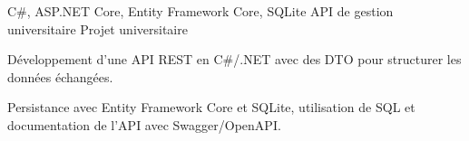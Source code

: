 
\begin{cventries}
  \cventry
    {C\#, ASP.NET Core, Entity Framework Core, SQLite}
    {API de gestion universitaire}
    {Projet universitaire}
    {}
    {
      \begin{cvitems}
        \item {Développement d’une API REST en C\#/.NET avec des DTO pour structurer les données échangées.}
        \item {Persistance avec Entity Framework Core et SQLite, utilisation de SQL et documentation de l’API avec Swagger/OpenAPI.}
      \end{cvitems}
    }
\end{cventries}
